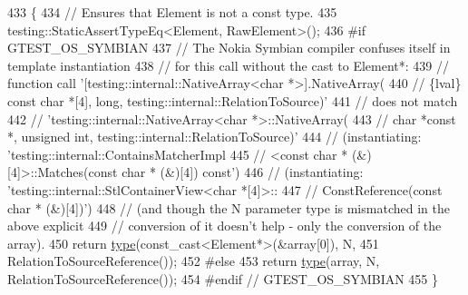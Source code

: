 \begin{DoxyCode}
433                                                                    \{
434     \textcolor{comment}{// Ensures that Element is not a const type.}
435     testing::StaticAssertTypeEq<Element, RawElement>();
436 \textcolor{preprocessor}{#if GTEST\_OS\_SYMBIAN}
437     \textcolor{comment}{// The Nokia Symbian compiler confuses itself in template instantiation}
438     \textcolor{comment}{// for this call without the cast to Element*:}
439     \textcolor{comment}{// function call '[testing::internal::NativeArray<char *>].NativeArray(}
440     \textcolor{comment}{//     \{lval\} const char *[4], long, testing::internal::RelationToSource)'}
441     \textcolor{comment}{//     does not match}
442     \textcolor{comment}{// 'testing::internal::NativeArray<char *>::NativeArray(}
443     \textcolor{comment}{//     char *const *, unsigned int, testing::internal::RelationToSource)'}
444     \textcolor{comment}{// (instantiating: 'testing::internal::ContainsMatcherImpl}
445     \textcolor{comment}{//     <const char * (&)[4]>::Matches(const char * (&)[4]) const')}
446     \textcolor{comment}{// (instantiating: 'testing::internal::StlContainerView<char *[4]>::}
447     \textcolor{comment}{//     ConstReference(const char * (&)[4])')}
448     \textcolor{comment}{// (and though the N parameter type is mismatched in the above explicit}
449     \textcolor{comment}{// conversion of it doesn't help - only the conversion of the array).}
450     \textcolor{keywordflow}{return} \hyperlink{classtesting_1_1internal_1_1StlContainerView_3_01Element[N]_4_a364efca99cc5a02829b4e3413c506b09}{type}(const\_cast<Element*>(&array[0]), N,
451                 RelationToSourceReference());
452 \textcolor{preprocessor}{#else}
453     \textcolor{keywordflow}{return} \hyperlink{classtesting_1_1internal_1_1StlContainerView_3_01Element[N]_4_a364efca99cc5a02829b4e3413c506b09}{type}(array, N, RelationToSourceReference());
454 \textcolor{preprocessor}{#endif  // GTEST\_OS\_SYMBIAN}
455   \}
\end{DoxyCode}
